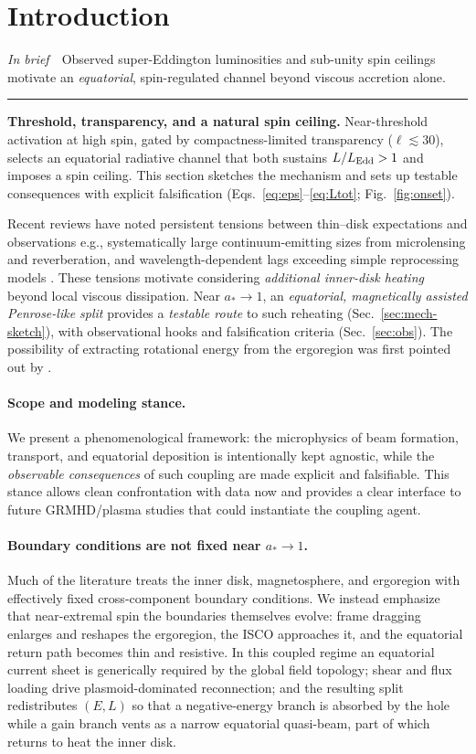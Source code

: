 \documentclass[twocolumn]{aastex701}
\newcommand{\ellcrit}{30}
\newcommand{\ellsoft}{\ell\lesssim\ellcrit}  %
\providecommand{\tldr}[1]{%
  \noindent\textit{In brief}\ \textemdash\ #1%
  \par\smallskip
  \noindent\rule{\columnwidth}{0.2pt}\par\medskip
}
\begin{document}
\section{Introduction}\label{sec:intro}
\tldr{Observed super-Eddington luminosities and sub-unity spin ceilings motivate an \emph{equatorial}, spin-regulated channel beyond viscous accretion alone.}
\noindent\textbf{Threshold, transparency, and a natural spin ceiling.}
Near-threshold activation at high spin, gated by compactness-limited transparency ($\ellsoft$), selects an equatorial radiative channel that both sustains $L/L_{\rm Edd}>1$ and imposes a spin ceiling.
This section sketches the mechanism and sets up testable consequences with explicit falsification (Eqs.~\eqref{eq:eps}--\eqref{eq:Ltot}; Fig.~\ref{fig:onset}).

Recent reviews have noted persistent tensions between thin--disk expectations and observations\textemdash{}
e.g., systematically large continuum-emitting sizes from microlensing and reverberation, and
wavelength-dependent lags exceeding simple reprocessing models \citep[e.g.,][]{Cackett2021RevMap,Sun2020AGNsize}.
These tensions motivate considering \emph{additional inner-disk heating} beyond local viscous dissipation.
Near $a_*\!\to\!1$, an \emph{equatorial, magnetically assisted Penrose-like split} provides a \emph{testable route}
to such reheating (Sec.~\ref{sec:mech-sketch}), with observational hooks and falsification criteria
(Sec.~\ref{sec:obs}).
The possibility of extracting rotational energy from the ergoregion was first pointed out by \cite{Penrose1969,Penrose2002}.


\paragraph{Scope and modeling stance.}
We present a phenomenological framework: the microphysics of beam formation, transport, and equatorial deposition is intentionally kept agnostic, while the \emph{observable consequences} of such coupling are made explicit and falsifiable. This stance allows clean confrontation with data now and provides a clear interface to future GRMHD/plasma studies that could instantiate the coupling agent.

\paragraph{Boundary conditions are not fixed near $a_*\!\to\!1$.}
Much of the literature treats the inner disk, magnetosphere, and ergoregion with effectively fixed cross-component boundary conditions. We instead emphasize that near-extremal spin the boundaries themselves evolve: frame dragging enlarges and reshapes the ergoregion, the ISCO approaches it, and the equatorial return path becomes thin and resistive. In this coupled regime an equatorial current sheet is generically required by the global field topology; shear and flux loading drive plasmoid-dominated reconnection; and the resulting split redistributes $(E,L)$ so that a negative-energy branch is absorbed by the hole while a gain branch vents as a narrow equatorial quasi-beam, part of which returns to heat the inner disk.
\end{document}
